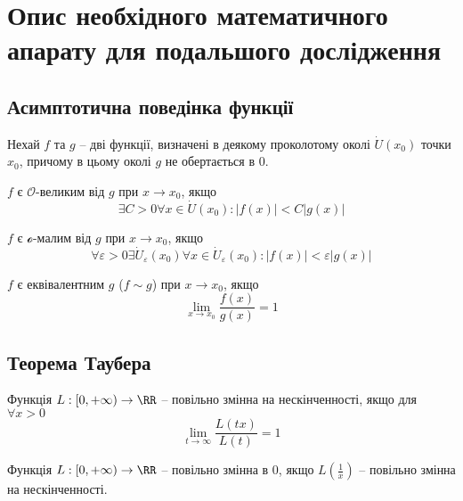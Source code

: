 \section{Опис необхідного математичного апарату для подальшого дослідження}
\jointitles
\subsection{Асимптотична поведінка функції}

Нехай $f$ та $g$ – дві функції, визначені в деякому проколотому околі $\dot U (x_0)$ точки $x_0$, причому в цьому околі $g$ не обертається в $0$.

\begin{defin}
	$f$ є  $\mathcal{O}$-великим від $g$ \cite{spivak2006calculus} при $x \rightarrow x_0$, якщо
	\begin{equation}
		\exists C > 0\forall x \in \dot U (x_0): |f(x)| < C|g(x)|
	\end{equation}
\end{defin}

\begin{defin}
	$f$ є $\mathcal{o}$-малим від $g$ \cite{spivak2006calculus} при $x \rightarrow x_0$, якщо
	\begin{equation}
		\forall \varepsilon > 0 \exists \dot U_{\varepsilon} (x_0) \forall x \in \dot U_{\varepsilon} (x_0): |f(x)| < \varepsilon |g(x)|
	\end{equation}
\end{defin}

\begin{defin}
	$f$ є еквівалентним $g$ \cite{spivak2006calculus} ($f \sim g$) при $x \rightarrow x_0$, якщо
	$$\lim_{x \rightarrow x_0} \frac{f(x)}{g(x)} = 1$$
\end{defin}

\subsection{Теорема Таубера}

\begin{defin}
Функція $L:[0, +\infty) \rightarrow \RR$ – повільно змінна на нескінченності,
якщо для $\forall x > 0$
$$\lim_{t \rightarrow \infty}\frac{L(tx)}{L(t)} =1$$
\end{defin}

\begin{defin}
Функція $L:[0, +\infty) \rightarrow \RR$ – повільно змінна в 0,
якщо $L(\frac{1}{x})$ – повільно змінна на нескінченності.
\end{defin}

